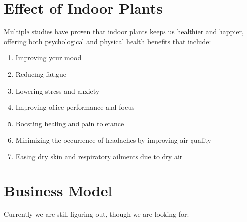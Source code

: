 \documentclass{article}
\begin{document}
\section{Effect of Indoor Plants}
Multiple studies have proven that indoor plants keeps us healthier and happier, offering both psychological and physical health benefits that include:

\begin{enumerate}

\item Improving your mood

\item Reducing fatigue

\item Lowering stress and anxiety

\item Improving office performance and focus

\item Boosting healing and pain tolerance

\item Minimizing the occurrence of headaches by improving air quality

\item Easing dry skin and respiratory ailments due to dry air

\end{enumerate}

\section{Business Model}

Currently we are still figuring out, though we are looking for:
\end{document}
